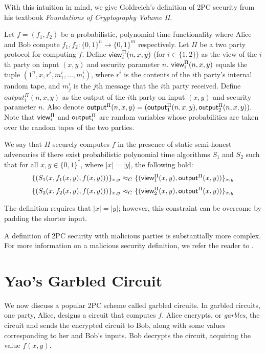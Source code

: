 With this intuition in mind, we give Goldreich's definition of 2PC security from his textbook \textit{Foundations of Cryptography Volume II}\cite{goldreich}.

\begin{definition}
Let $f = (f_1, f_2)$ be a probabilistic, polynomial time functionality where Alice and Bob compute $f_1, f_2: \{0,1\}^n \to \{0,1\}^m$ respectively.
Let $\Pi$ be a two party protocol for computing $f$. 
Define ${\sf view}_i^{\Pi}(n,x,y)$ (for $i \in \{1,2\}$) as the view of the $i$th party on input $(x,y)$ and security parameter $n$.
${\sf view}_i^{\Pi}(n,x,y)$ equals the tuple $(1^n, x, r^i, m_1^i, \ldots, m_t^i)$, where $r^i$ is the contents of the $i$th party's internal random tape, and $m_j^i$ is the $j$th message that the $i$th party received.
Define $output^{\Pi}_i(n,x,y)$ as the output of the $i$th party on input $(x,y)$ and security parameter $n$.
Also denote $ {\sf output}^{\Pi}(n,x,y) = ({\sf output}^{\Pi}_1(n,x,y), {\sf output}^{\Pi}_2(n,x,y)).$
Note that ${\sf view}^{\Pi}_i$ and ${\sf output}^{\Pi}_i$ are random variables whose probabilities are taken over the random tapes of the two parties. 

We say that $\Pi$ securely computes $f$ in the presence of static semi-honest adversaries if there exist probabilistic polynomial time algorithms $S_1$ and $S_2$ such that for all $x,y \in \{0,1\}^*$, where $|x| = |y|$, the following hold:
\begin{equation} 
    \label{eqn:secdef1}
    \{(S_1(x, f_1(x,y), f(x,y)))\}_{x,y} \approx_C \{({\sf view}^{\Pi}_1(x,y), {\sf output}^{\Pi}(x,y)) \}_{x,y} 
\end{equation}
\begin{equation} 
    \label{eqn:secdef2}
    \{(S_2(x, f_2(x,y), f(x,y)))\}_{x,y} \approx_C \{({\sf view}^{\Pi}_2(x,y), {\sf output}^{\Pi}(x,y)) \}_{x,y} 
\end{equation}
\end{definition}

The definition requires that $|x| = |y|$; however, this constraint can be overcome by padding the shorter input.

A definition of 2PC security with malicious parties is substantially more complex.
For more information on a malicious security definition, we refer the reader to \cite{lindell2009}.

\section{Yao's Garbled Circuit}
We now discuss a popular 2PC scheme called garbled circuits.
In garbled circuits, one party, Alice, designs a circuit that computes $f$.
Alice encrypts, or \textit{garbles}, the circuit and sends the encrypted circuit to Bob, along with some values corresponding to her and Bob's inputs.
Bob decrypts the circuit, acquiring the value $f(x,y)$.

